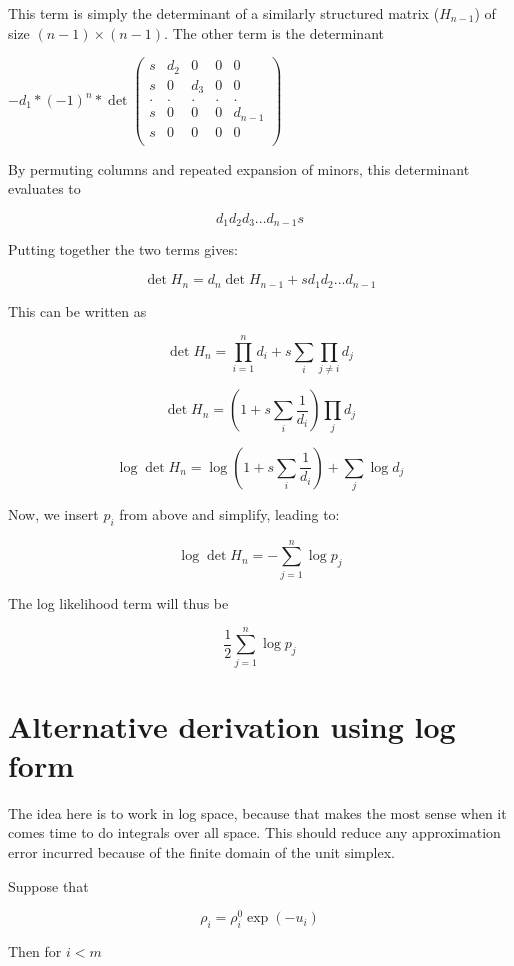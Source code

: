 \documentclass[12pt]{article}
\begin{document}
This term is simply the determinant of a similarly structured matrix ($H_{n-1}$) of size $(n-1)\times(n-1)$.  The other term is the determinant

\begin{math}
-d_1 * (-1)^n * \det
\begin{pmatrix}
 s   & d_2   & 0   & 0 & 0 \\
 s   & 0     & d_3 & 0 & 0 \\
 .   & .     & .   & . & . \\
 s   & 0     & 0   & 0 & d_{n-1} \\
 s   & 0     & 0   & 0 & 0 \\
\end{pmatrix}
\end{math}

By permuting columns and repeated expansion of minors, this determinant evaluates to 

$$d_1 d_2 d_3 ... d_{n-1} s$$

Putting together the two terms gives:

$$\det H_n = d_n  \det H_{n-1} + s d_1 d_2 ... d_{n-1}$$

This can be written as

$$ \det H_n = \prod_{i=1}^n d_i + s \sum_i \prod_{j \ne i} d_j$$

$$\det H_n = (1 + s\sum_i \frac{1}{d_i}) \prod_j d_j$$

$$ \log \det H_n = \log(1 + s \sum_i \frac{1}{d_i}) + \sum_j \log d_j$$


Now, we insert $p_i$ from above and simplify, leading to:

$$\log \det H_n = -\sum_{j=1}^n \log p_j$$

The log likelihood term will thus be

$$\frac{1}{2}  \sum_{j=1}^n \log p_j $$

\section{Alternative derivation using log form}

The idea here is to work in log space, because that makes the most sense when it comes time to do integrals over all space.  This should reduce any approximation error incurred because of the finite domain of the unit simplex.  

Suppose that 

$$\rho_i = \rho_i^0 \exp(-u_i)$$

Then for $i < m$
\end{document}
